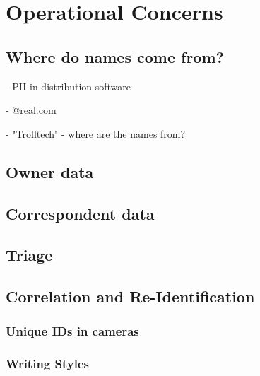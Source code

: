 \chapter{Operational Concerns}
\section{Where do names come from?}
 - PII in distribution software

   - @real.com

 - "Trolltech" - where are the names from?
\section{Owner data}
\section{Correspondent data}
\section{Triage}
\section{Correlation and Re-Identification}
\subsection{Unique IDs in cameras}
\subsection{Writing Styles}
